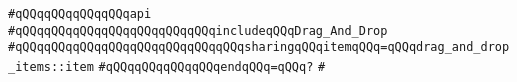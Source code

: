 \verb|#qQQqqQQqqQQqqQQqapi|\newline
\verb|#qQQqqQQqqQQqqQQqqQQqqQQqqQQqincludeqQQqDrag_And_Drop|\newline
\verb|#qQQqqQQqqQQqqQQqqQQqqQQqqQQqqQQqsharingqQQqitemqQQq=qQQqdrag_and_drop_items::item|\newline
\verb|#qQQqqQQqqQQqqQQqendqQQq=qQQq?|\newline
\verb|#|\newline
\newline
\newline
\newline
\newline
\newline
\newline

